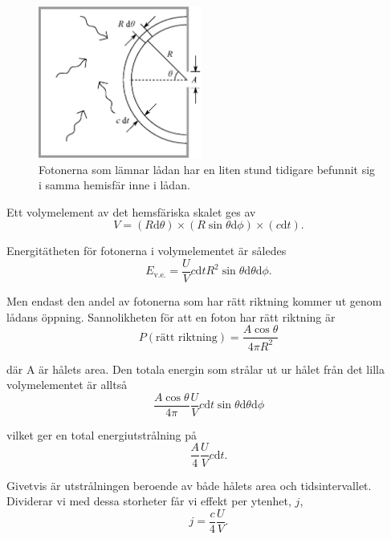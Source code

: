 \begin{figure}[hpbt]
\centering
\includegraphics[height=5cm]{images/blackbody_box.eps}
\caption{\label{fig:box}{Fotonerna som lämnar lådan har en liten stund tidigare befunnit sig i samma hemisfär inne i lådan.}}
\end{figure}


Ett volymelement av det hemsfäriska skalet ges av
\begin{equation}
V=(R\mathrm{d}\theta) \times (R\sin\theta\mathrm{d}\phi) \times (c \mathrm{d}t).
\end{equation}

Energitätheten för fotonerna i volymelementet är således
\begin{equation}
E_\text{v.e.}=\frac{U}{V} c \mathrm{d}t R^2 \sin\theta \mathrm{d}\theta \mathrm{d}\phi.
\end{equation}

Men endast den andel av fotonerna som har rätt riktning kommer ut genom lådans öppning. Sannolikheten för att en foton har rätt riktning är
\begin{equation}
P(\text{rätt riktning})=\frac{A\cos\theta}{4\pi R^2}
\end{equation}

där A är hålets area. Den totala energin som strålar ut ur hålet från det lilla 
volymelementet är alltså 
\begin{equation}
\frac{A\cos\theta}{4\pi}\frac{U}{V} c\mathrm{d}t \sin\theta\mathrm{d}\theta \mathrm{d}\phi
\end{equation}

vilket ger en total energiutstrålning på
\begin{equation}
\frac{A}{4}\frac{U}{V}c \mathrm{d}t.
\end{equation}

Givetvis är utstrålningen beroende av både hålets area och tidsintervallet. Dividerar vi med dessa storheter får vi effekt per ytenhet, $j$,
\begin{equation}
j=\frac{c}{4}\frac{U}{V}. 
\end{equation}

